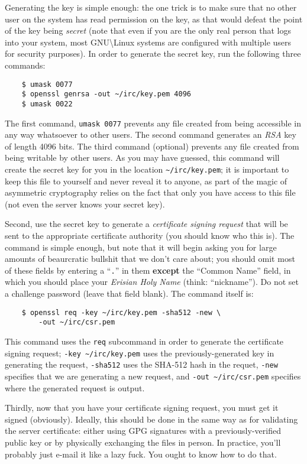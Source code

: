 \documentclass{article}
\begin{document}
{Generating the key is simple enough: the one trick is to make sure that no other user on the system has read permission on the key, as that would defeat the point of the key being \textit{secret} (note that even if you are the only real person that logs into your system, most GNU\textbackslash Linux systems are configured with multiple users for security purposes).  In order to generate the secret key, run the following three commands:
\begin{lstlisting}
    $ umask 0077
    $ openssl genrsa -out ~/irc/key.pem 4096
    $ umask 0022
\end{lstlisting}
The first command, \texttt{umask 0077} prevents any file created from being accessible in any way whatsoever to other users.  The second command generates an \textit{RSA} key of length 4096 bits.  The third command (optional) prevents any file created from being writable by other users.  As you may have guessed, this command will create the secret key for you in the location \texttt{\textasciitilde/irc/key.pem}; it is important to keep this file to yourself and never reveal it to anyone, as part of the magic of asymmetric cryptography relies on the fact that only you have access to this file (not even the server knows your secret key).

Second, use the secret key to generate a \textit{certificate signing request} that will be sent to the appropriate certificate authority (you should know who this is).  The command is simple enough, but note that it will begin asking you for large amounts of beaurcratic bullshit that we don't care about; you should omit most of these fields by entering a ``\texttt{.}'' in them \textbf{except} the ``Common Name'' field, in which you should place your \textit{Erisian Holy Name} (think: ``nickname'').  Do not set a challenge password (leave that field blank).  The command itself is:
\begin{lstlisting}
    $ openssl req -key ~/irc/key.pem -sha512 -new \
        -out ~/irc/csr.pem
\end{lstlisting}
This command uses the \texttt{req} subcommand in order to generate the certificate signing request; \texttt{-key \textasciitilde/irc/key.pem} uses the previously-generated key in generating the request, \texttt{-sha512} uses the SHA-512 hash in the requet, \texttt{-new} specifies that we are generating a new request, and \texttt{-out \textasciitilde/irc/csr.pem} specifies where the generated request is output.

Thirdly, now that you have your certificate signing request, you must get it signed (obviously).  Ideally, this should be done in the same way as for validating the server certificate: either using GPG signatures with a previously-verified public key or by physically exchanging the files in person.  In practice, you'll probably just e-mail it like a lazy fuck.  You ought to know how to do that.

}
\end{document}
